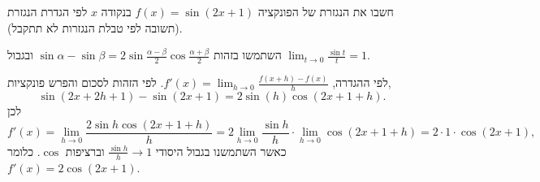 
\begin{question}
חשבו את הנגזרת של הפונקציה $f(x)=\sin(2x+1)$ בנקודה $x$ לפי הגדרת הנגזרת (תשובה לפי טבלת הנגזרות לא תתקבל).
\end{question}

\begin{hint}
השתמשו בזהות $\sin\alpha-\sin\beta=2\sin\frac{\alpha-\beta}{2}\cos\frac{\alpha+\beta}{2}$ ובגבול $\lim_{t\to0}\frac{\sin t}{t}=1$.
\end{hint}

\begin{solution}
לפי ההגדרה, $f'(x)=\lim_{h\to0}\frac{f(x+h)-f(x)}{h}$. לפי הזהות לסכום והפרש פונקציות,
\[ \sin(2x+2h+1)-\sin(2x+1)=2\sin(h)\cos(2x+1+h). \]
לכן
\[ f'(x)=\lim_{h\to0}\frac{2\sin h\cos(2x+1+h)}{h}=2\lim_{h\to0}\frac{\sin h}{h}\cdot\lim_{h\to0}\cos(2x+1+h)=2\cdot1\cdot\cos(2x+1), \]
כאשר השתמשנו בגבול היסודי $\frac{\sin h}{h}\to1$ וברציפות $\cos$. כלומר $\boxed{f'(x)=2\cos(2x+1)}$.
\end{solution}
